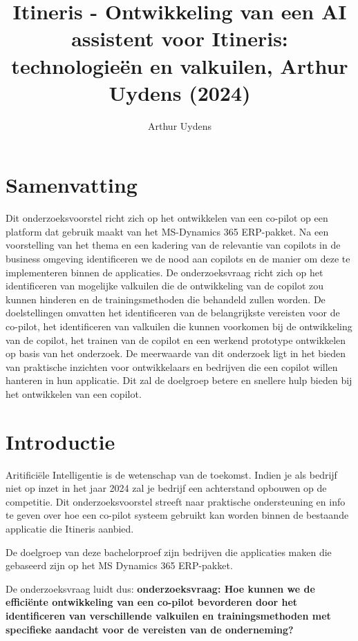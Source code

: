 \documentclass{hogent-article}
\title{Itineris - Ontwikkeling van een AI assistent voor Itineris: technologieën en valkuilen, Arthur Uydens (2024) }
\author{Arthur Uydens }
\begin{document}
\section{Samenvatting}
Dit onderzoeksvoorstel richt zich op het ontwikkelen van een co-pilot op een platform dat gebruik maakt van het MS-Dynamics 365 ERP-pakket. Na een voorstelling van het thema en een kadering van de relevantie van copilots in de business omgeving identificeren we de nood aan copilots en de manier om deze te implementeren binnen de applicaties.
De onderzoeksvraag richt zich op het identificeren van mogelijke valkuilen die de ontwikkeling van de copilot zou kunnen hinderen en de trainingsmethoden die behandeld zullen worden. De doelstellingen omvatten het identificeren van de belangrijkste vereisten voor de co-pilot, het identificeren van valkuilen die kunnen voorkomen bij de ontwikkeling van de copilot, het trainen van de copilot en een werkend prototype ontwikkelen op basis van het onderzoek. De meerwaarde van dit onderzoek ligt in het bieden van praktische inzichten voor ontwikkelaars en bedrijven die een copilot willen hanteren in hun applicatie. Dit zal de doelgroep betere en snellere hulp bieden bij het ontwikkelen van een copilot. 

\section{Introductie}
Aritificiële Intelligentie is de wetenschap van de toekomst. Indien je als bedrijf niet op inzet in het jaar 2024 zal je bedrijf een achterstand opbouwen op de competitie. Dit onderzoeksvoorstel streeft naar praktische ondersteuning en info te geven over hoe een co-pilot systeem gebruikt kan worden binnen de bestaande applicatie die Itineris aanbied.  

De doelgroep van deze bachelorproef zijn bedrijven die applicaties maken die gebaseerd zijn op het MS Dynamics 365 ERP-pakket. 

De onderzoeksvraag luidt dus: \textbf{
  onderzoeksvraag: Hoe kunnen we de efficiënte ontwikkeling van een co-pilot bevorderen door het identificeren van verschillende valkuilen en trainingsmethoden met specifieke aandacht voor de vereisten van de onderneming? 
}
\end{document}
